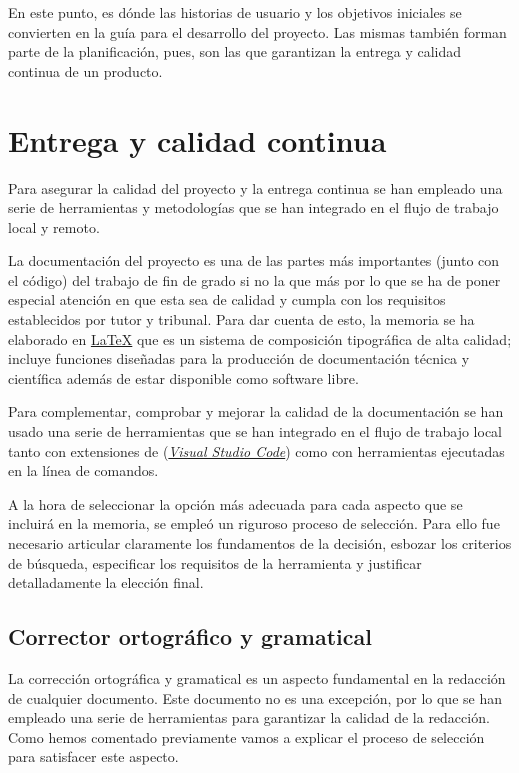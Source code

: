 En este punto, es dónde las historias de usuario y los objetivos iniciales se convierten en la guía para el desarrollo del proyecto. Las mismas también forman parte de la planificación, pues, son las que garantizan la entrega y calidad continua de un producto.

\section{Entrega y calidad continua}

Para asegurar la calidad del proyecto y la entrega continua se han empleado una serie de herramientas y metodologías que se han integrado en el flujo de trabajo local y remoto.

La documentación del proyecto es una de las partes más importantes (junto con el código) del trabajo de fin de grado si no la que más por lo que se ha de poner especial atención en que esta sea de calidad y cumpla con los requisitos establecidos por tutor y tribunal. Para dar cuenta de esto, la memoria se ha elaborado en \href{https://www.latex-project.org/}{\LaTeX{}} que es un sistema de composición tipográfica de alta calidad; incluye funciones diseñadas para la producción de documentación técnica y científica además de estar disponible como software libre.

Para complementar, comprobar y mejorar la calidad de la documentación se han usado una serie de herramientas que se han integrado en el flujo de trabajo local tanto con extensiones de (\href{https://code.visualstudio.com/}{\textit{Visual Studio Code}}) como con herramientas ejecutadas en la línea de comandos.

A la hora de seleccionar la opción más adecuada para cada aspecto que se incluirá en la memoria, se empleó un riguroso proceso de selección. Para ello fue necesario articular claramente los fundamentos de la decisión, esbozar los criterios de búsqueda, especificar los requisitos de la herramienta y justificar detalladamente la elección final.

\subsection{Corrector ortográfico y gramatical}

La corrección ortográfica y gramatical es un aspecto fundamental en la redacción de cualquier documento. Este documento no es una excepción, por lo que se han empleado una serie de herramientas para garantizar la calidad de la redacción. Como hemos comentado previamente vamos a explicar el proceso de selección para satisfacer este aspecto.

